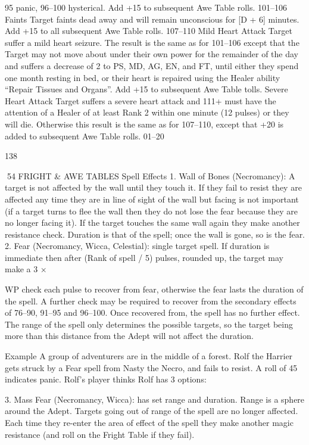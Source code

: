 \documentclass[a4paper]{article}
\begin{document}
\begin{multicols}{3}
95 panic, 96–100 hysterical. Add +15 to subsequent Awe Table
rolls.
101–106 Faints Target faints dead away and will remain unconscious for
[D + 6] minutes. Add +15 to all subsequent Awe Table rolls.
107–110 Mild Heart Attack Target suffer a mild heart seizure. The result
is the same as for 101–106 except that the Target may not move
about under their own power for the remainder of the day and
suffers a decrease of 2 to PS, MD, AG, EN, and FT, until either
they spend one month resting in bed, or their heart is repaired
using the Healer ability “Repair Tissues and Organs”. Add +15 to
subsequent Awe Table tolls.
Severe Heart Attack Target suffers a severe heart attack and
111+
must have the attention of a Healer of at least Rank 2 within one
minute (12 pulses) or they will die. Otherwise this result is the
same as for 107–110, except that +20 is added to subsequent Awe
Table rolls.
01–20

138

54 FRIGHT & AWE TABLES
Spell Effects
1. Wall of Bones (Necromancy): A target is not
affected by the wall until they touch it. If they fail
to resist they are affected any time they are in line
of sight of the wall but facing is not important (if a
target turns to flee the wall then they do not lose
the fear because they are no longer facing it). If the
target touches the same wall again they make another resistance check. Duration is that of the spell;
once the wall is gone, so is the fear.
2. Fear (Necromancy, Wicca, Celestial): single
target spell.
If duration is immediate then after (Rank of spell /
5) pulses, rounded up, the target may make a 3 ×

WP check each pulse to recover from fear, otherwise the fear lasts the duration of the spell. A further check may be required to recover from the
secondary effects of 76–90, 91–95 and 96–100.
Once recovered from, the spell has no further effect. The range of the spell only determines the
possible targets, so the target being more than this
distance from the Adept will not affect the duration.

Example
A group of adventurers are in the middle of
a forest. Rolf the Harrier gets struck by a Fear spell from
Nasty the Necro, and fails to resist. A roll of 45 indicates
panic. Rolf’s player thinks Rolf has 3 options:

3. Mass Fear (Necromancy, Wicca): has set range
and duration. Range is a sphere around the Adept.
Targets going out of range of the spell are no
longer affected. Each time they re-enter the area of
effect of the spell they make another magic resistance (and roll on the Fright Table if they fail).


\end{multicols}
\end{document}
